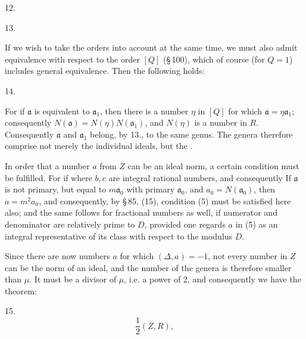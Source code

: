 12. 

13. 

If we wish to take the orders into account at the same time, we must also admit equivalence with respect to the order $[Q]$ (\S\,100), which of course (for $Q = 1$) includes general equivalence. Then the following holds:

14. 

For if $\mathfrak{a}$ is equivalent to $\mathfrak{a}_1$, then there is a number $\eta$ in $[Q]$ for which $\mathfrak{a} = \eta \mathfrak{a}_1$; consequently $N(\mathfrak{a}) = N(\eta) N(\mathfrak{a}_1)$, and $N(\eta)$ is a number in $R$. Consequently $\mathfrak{a}$ and $\mathfrak{a}_1$ belong, by 13., to the same genus. The genera therefore comprise not merely the individual ideals, but the .

In order that a number $a$ from $Z$ can be an ideal norm, a certain condition must be fulfilled. For if
where $b, c$ are integral rational numbers, and consequently
If $\mathfrak{a}$ is not primary, but equal to $m \mathfrak{a}_0$ with primary $\mathfrak{a}_0$, and $a_0 = N(\mathfrak{a}_0)$, then $a = m^2 a_0$, and consequently, by \S\,85, (15), condition (5) must be satisfied here also; and the same follows for fractional numbers as well, if numerator and denominator are relatively prime to $D$, provided one regards $a$ in (5) as an integral representative of its class with respect to the modulus $D$.

Since there are now numbers $a$ for which $(\Delta, a) = -1$, not every number in $Z$ can be the norm of an ideal, and the number of the genera is therefore smaller than $\mu$. It must be a divisor of $\mu$, i.e. a power of 2, and consequently we have the theorem:

15. 
\[
\frac{1}{2} (Z, R),
\]

